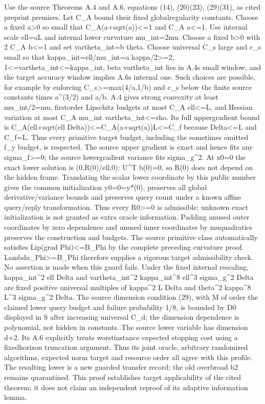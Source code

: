 \documentclass[10pt,a4paper]{article}
\begin{document}
Use the source Theorems A.4 and A.6, equations (14), (20)(23), (29)(31), as cited preprint premises. Let C\_A bound their fixed globalregularity constants. Choose a fixed a>0 so small that C\_A(a+sqrt(a))<=1 and C\_A a<=1. Use internal scale ell=aL and internal lower curvature mu\_int=2mu. Choose a fixed b>0 with 2 C\_A b<=1 and set vartheta\_int=b theta. Choose universal C\_s large and c\_s small so that kappa\_int=ell/mu\_int=a kappa/2>=2, 1<=vartheta\_int<=kappa\_int, beta vartheta\_int lies in A.4s small window, and the target accuracy window implies A.6s internal one. Such choices are possible, for example by enforcing C\_s>=max(4/a,1/b) and c\_s below the finite source constants times a\textasciicircum{}(3/2) and a/b.
A.4 gives strong convexity at least mu\_int/2=mu, firstorder Lipschitz budgets at most C\_A ell<=L, and Hessian variation at most C\_A mu\_int vartheta\_int<=rho. Its full uppergradient bound is C\_A(ell+sqrt(ell Delta))<=C\_A(a+sqrt(a))L<=C\_f because Delta<=L and C\_f=L. Thus every primitive target budget, including the sometimes omitted f\_y budget, is respected. The source upper gradient is exact and hence fits any sigma\_f>=0; the source lowergradient variance fits sigma\_g\textasciicircum{}2.
At x0=0 the exact lower solution is (0,R(0)/ell,0): U\textasciicircum{}T b(0)=0, so R(0) does not depend on the hidden frame. Translating the scalar lower coordinate by this public number gives the common initialization y0=0=y*(0), preserves all global derivative/variance bounds and preserves query count under a known affine query/reply transformation. Thus every R0>=0 is admissible; unknown exact initialization is not granted as extra oracle information. Padding unused outer coordinates by zero dependence and unused inner coordinates by muquadratics preserves the construction and budgets.
The source primitive class automatically satisfies Lip(grad Phi)<=B\_Phi by the complete preceding curvature proof. Lambda\_Phi>=B\_Phi therefore supplies a rigorous target admissibility check. No assertion is made when this guard fails. Under the fixed internal rescaling, kappa\_int\textasciicircum{}2 ell Delta and vartheta\_int\textasciicircum{}2 kappa\_int\textasciicircum{}8 ell\textasciicircum{}3 sigma\_g\textasciicircum{}2 Delta are fixed positive universal multiples of kappa\textasciicircum{}2 L Delta and theta\textasciicircum{}2 kappa\textasciicircum{}8 L\textasciicircum{}3 sigma\_g\textasciicircum{}2 Delta. The source dimension condition (29), with M of order the claimed lower query budget and failure probability 1/8, is bounded by D0 displayed in S after increasing universal C\_d; the dimension dependence is polynomial, not hidden in constants. The source lower variable has dimension d+2. Its A.6 explicitly treats worstinstance expected stopping cost using a fixedhorizon truncation argument. Thus its joint oracle, arbitrary randomized algorithms, expected norm target and resource order all agree with this profile. The resulting lower is a new guarded transfer record; the old overbroad b2 remains quarantined. This proof establishes target applicability of the cited theorem; it does not claim an independent reproof of its adaptive information lemma.
\end{document}
